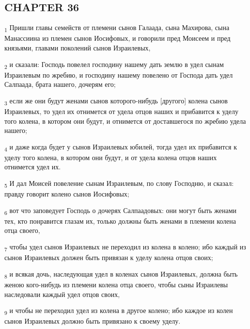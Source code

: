 \subsection{CHAPTER 36}
\begin{tcolorbox}
\textsubscript{1} Пришли главы семейств от племени сынов Галаада, сына Махирова, сына Манассиина из племен сынов Иосифовых, и говорили пред Моисеем и пред князьями, главами поколений сынов Израилевых,
\end{tcolorbox}
\begin{tcolorbox}
\textsubscript{2} и сказали: Господь повелел господину нашему дать землю в удел сынам Израилевым по жребию, и господину нашему повелено от Господа дать удел Салпаада, брата нашего, дочерям его;
\end{tcolorbox}
\begin{tcolorbox}
\textsubscript{3} если же они будут женами сынов которого-нибудь [другого] колена сынов Израилевых, то удел их отнимется от удела отцов наших и прибавится к уделу того колена, в котором они будут, и отнимется от доставшегося по жребию удела нашего;
\end{tcolorbox}
\begin{tcolorbox}
\textsubscript{4} и даже когда будет у сынов Израилевых юбилей, тогда удел их прибавится к уделу того колена, в котором они будут, и от удела колена отцов наших отнимется удел их.
\end{tcolorbox}
\begin{tcolorbox}
\textsubscript{5} И дал Моисей повеление сынам Израилевым, по слову Господню, и сказал: правду говорит колено сынов Иосифовых;
\end{tcolorbox}
\begin{tcolorbox}
\textsubscript{6} вот что заповедует Господь о дочерях Салпаадовых: они могут быть женами тех, кто понравится глазам их, только должны быть женами в племени колена отца своего,
\end{tcolorbox}
\begin{tcolorbox}
\textsubscript{7} чтобы удел сынов Израилевых не переходил из колена в колено; ибо каждый из сынов Израилевых должен быть привязан к уделу колена отцов своих;
\end{tcolorbox}
\begin{tcolorbox}
\textsubscript{8} и всякая дочь, наследующая удел в коленах сынов Израилевых, должна быть женою кого-нибудь из племени колена отца своего, чтобы сыны Израилевы наследовали каждый удел отцов своих,
\end{tcolorbox}
\begin{tcolorbox}
\textsubscript{9} и чтобы не переходил удел из колена в другое колено; ибо каждое из колен сынов Израилевых должно быть привязано к своему уделу.
\end{tcolorbox}

